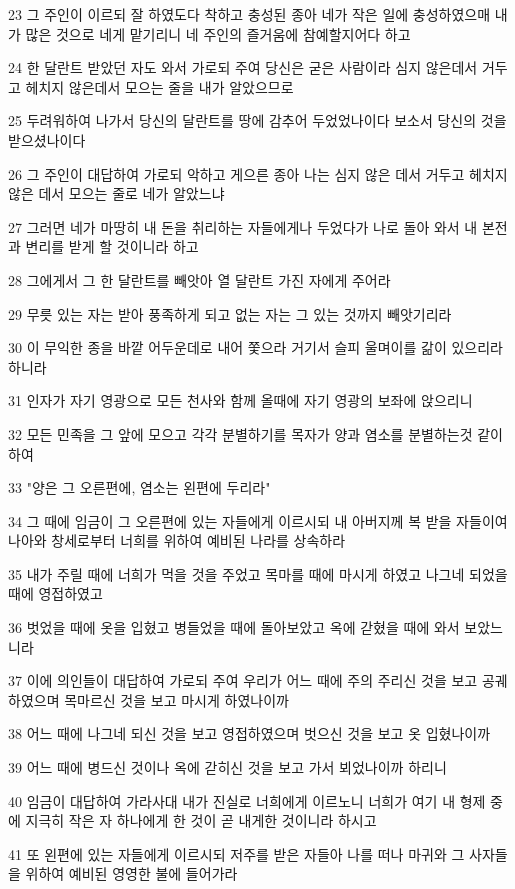\par 23 그 주인이 이르되 잘 하였도다 착하고 충성된 종아 네가 작은 일에 충성하였으매 내가 많은 것으로 네게 맡기리니 네 주인의 즐거움에 참예할지어다 하고
\par 24 한 달란트 받았던 자도 와서 가로되 주여 당신은 굳은 사람이라 심지 않은데서 거두고 헤치지 않은데서 모으는 줄을 내가 알았으므로
\par 25 두려워하여 나가서 당신의 달란트를 땅에 감추어 두었었나이다 보소서 당신의 것을 받으셨나이다
\par 26 그 주인이 대답하여 가로되 악하고 게으른 종아 나는 심지 않은 데서 거두고 헤치지 않은 데서 모으는 줄로 네가 알았느냐
\par 27 그러면 네가 마땅히 내 돈을 취리하는 자들에게나 두었다가 나로 돌아 와서 내 본전과 변리를 받게 할 것이니라 하고
\par 28 그에게서 그 한 달란트를 빼앗아 열 달란트 가진 자에게 주어라
\par 29 무릇 있는 자는 받아 풍족하게 되고 없는 자는 그 있는 것까지 빼앗기리라
\par 30 이 무익한 종을 바깥 어두운데로 내어 쫓으라 거기서 슬피 울며이를 갊이 있으리라 하니라
\par 31 인자가 자기 영광으로 모든 천사와 함께 올때에 자기 영광의 보좌에 앉으리니
\par 32 모든 민족을 그 앞에 모으고 각각 분별하기를 목자가 양과 염소를 분별하는것 같이 하여
\par 33 "양은 그 오른편에, 염소는 왼편에 두리라"
\par 34 그 때에 임금이 그 오른편에 있는 자들에게 이르시되 내 아버지께 복 받을 자들이여 나아와 창세로부터 너희를 위하여 예비된 나라를 상속하라
\par 35 내가 주릴 때에 너희가 먹을 것을 주었고 목마를 때에 마시게 하였고 나그네 되었을 때에 영접하였고
\par 36 벗었을 때에 옷을 입혔고 병들었을 때에 돌아보았고 옥에 갇혔을 때에 와서 보았느니라
\par 37 이에 의인들이 대답하여 가로되 주여 우리가 어느 때에 주의 주리신 것을 보고 공궤하였으며 목마르신 것을 보고 마시게 하였나이까
\par 38 어느 때에 나그네 되신 것을 보고 영접하였으며 벗으신 것을 보고 옷 입혔나이까
\par 39 어느 때에 병드신 것이나 옥에 갇히신 것을 보고 가서 뵈었나이까 하리니
\par 40 임금이 대답하여 가라사대 내가 진실로 너희에게 이르노니 너희가 여기 내 형제 중에 지극히 작은 자 하나에게 한 것이 곧 내게한 것이니라 하시고
\par 41 또 왼편에 있는 자들에게 이르시되 저주를 받은 자들아 나를 떠나 마귀와 그 사자들을 위하여 예비된 영영한 불에 들어가라
